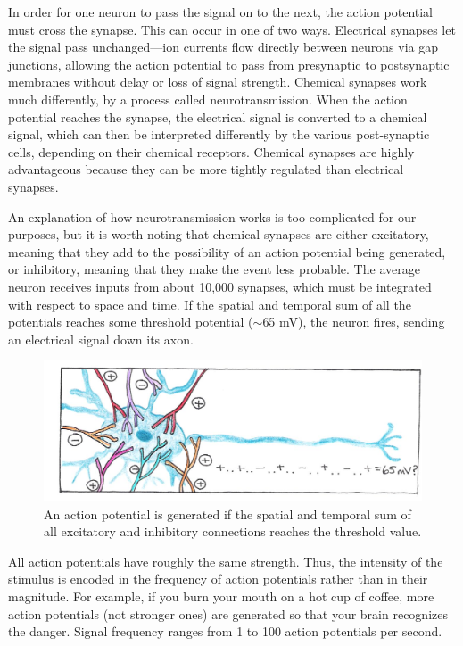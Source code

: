 In order for one neuron to pass the signal on to the next, the action potential must cross the synapse.  This can occur in one of two ways.  Electrical synapses let the signal pass unchanged—ion currents flow directly between neurons via gap junctions, allowing the action potential to pass from presynaptic to postsynaptic membranes without delay or loss of signal strength.  Chemical synapses work much differently, by a process called neurotransmission.  When the action potential reaches the synapse, the electrical signal is converted to a chemical signal, which can then be interpreted differently by the various post-synaptic cells, depending on their chemical receptors.  Chemical synapses are highly advantageous because they can be more tightly regulated than electrical synapses.

An explanation of how neurotransmission works is too complicated for our purposes, but it is worth noting that chemical synapses are either excitatory, meaning that they add to the possibility of an action potential being generated, or inhibitory, meaning that they make the event less probable.  The average neuron receives inputs from about 10,000 synapses, which must be integrated with respect to space and time.  If the spatial and temporal sum of all the potentials reaches some threshold potential ($\sim$65 mV), the neuron fires, sending an electrical signal down its axon.
\begin{figure}[!htb]
	\centering
	\includegraphics[width=\textwidth]{./figures/Topic11/Fig11-3.jpg}
	\caption{An action potential is generated if the spatial and temporal sum of all excitatory and inhibitory connections reaches the threshold value.}
	\label{Fig11-3}
\end{figure}

All action potentials have roughly the same strength.  Thus, the intensity of the stimulus is encoded in the frequency of action potentials rather than in their magnitude.  For example, if you burn your mouth on a hot cup of coffee, more action potentials (not stronger ones) are generated so that your brain recognizes the danger.  Signal frequency ranges from 1 to 100 action potentials per second.

